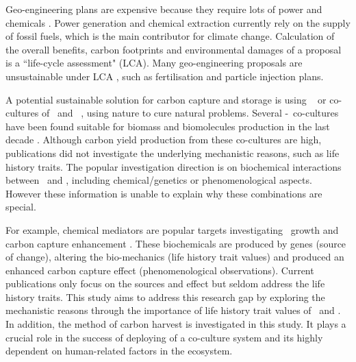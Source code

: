\documentclass[../thesis.tex]{subfiles} %
\begin{document}
Geo-engineering plans are expensive because they require lots of power and chemicals \autocite{boyd2008ranking,boyd2008implications,mcclellan2012cost}.  Power generation and chemical extraction currently rely on the supply of fossil fuels, which is the main contributor for climate change.  Calculation of the overall benefits, carbon footprints and environmental damages of a proposal is a ``life-cycle assessment" (LCA).  Many geo-engineering proposals are unsustainable under LCA \autocite{abdussalam2020green}, such as fertilisation and particle injection plans.

A potential sustainable solution for carbon capture and storage is using \phy\ \autocite{farrelly2013carbon} or co-cultures of \phy\ and \bac\ \autocite{fuentes2016impact}, using nature to cure natural problems.  Several \phy-\bac\ co-cultures have been found suitable for biomass and biomolecules production in the last decade \autocite{fuentes2016impact,santos2014microalgal}.  Although carbon yield production from these co-cultures are high, publications did not investigate the underlying mechanistic reasons, such as life history traits.  The popular investigation direction is on biochemical interactions between \phy\ and \bac, including chemical/genetics \autocite{amin2009photolysis,durham2015cryptic,leyva2014accumulation,rivas2010interactions,seyedsayamdost2011roseobacticides} or phenomenological \autocite{choix2012enhanced1,choix2012enhanced2,kazamia2012mutualistic,santos2014microalgal} aspects.  However these information is unable to explain why these combinations are special.

For example, chemical mediators are popular targets investigating \phy\ growth and carbon capture enhancement \autocite{fuentes2016impact}.  These biochemicals are produced by genes (source of change), altering the bio-mechanics (life history trait values) and produced an enhanced carbon capture effect (phenomenological observations).  Current publications only focus on the sources and effect but seldom address the life history traits.  This study aims to address this research gap by exploring the mechanistic reasons through the importance of life history trait values of \phy\ and \bac.  In addition, the method of carbon harvest is investigated in this study.  It plays a crucial role in the success of deploying of a co-culture system and its highly dependent on human-related factors in the ecosystem.
\end{document}
